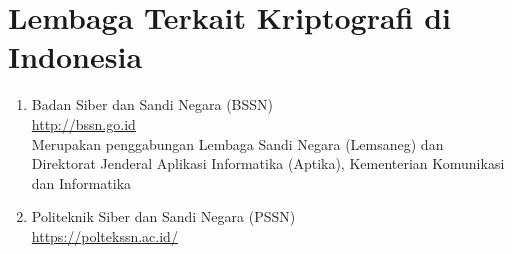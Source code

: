 \documentclass{article}
\begin{document}

\section*{Lembaga Terkait Kriptografi di Indonesia}

\begin{enumerate}
    \item Badan Siber dan Sandi Negara (BSSN)\\
    \url{http://bssn.go.id}\\
    Merupakan penggabungan Lembaga Sandi Negara (Lemsaneg) dan Direktorat Jenderal Aplikasi Informatika (Aptika), Kementerian Komunikasi dan Informatika
    \vspace{10mm}
    \item Politeknik Siber dan Sandi Negara (PSSN)\\
    \url{https://poltekssn.ac.id/}
\end{enumerate}
\end{document}
